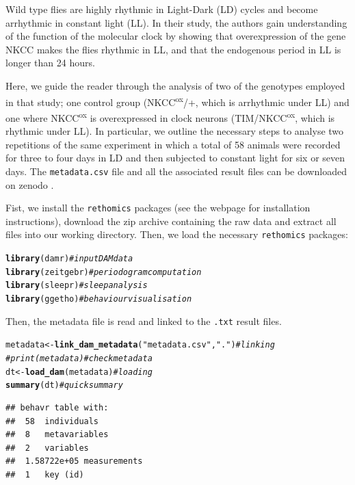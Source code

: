 \documentclass[10pt,letterpaper]{article}\usepackage[]{graphicx}\usepackage[]{color}
\makeatletter
\newcommand{\hlstr}[1]{\textcolor[rgb]{0.192,0.494,0.8}{#1}}%
\newcommand{\hlcom}[1]{\textcolor[rgb]{0.678,0.584,0.686}{\textit{#1}}}%
\newcommand{\hlstd}[1]{\textcolor[rgb]{0.345,0.345,0.345}{#1}}%
\newcommand{\hlkwb}[1]{\textcolor[rgb]{0.69,0.353,0.396}{#1}}%
\newcommand{\hlkwd}[1]{\textcolor[rgb]{0.737,0.353,0.396}{\textbf{#1}}}%
\newenvironment{kframe}{%
 \def\at@end@of@kframe{}%
 \ifinner\ifhmode%
  \def\at@end@of@kframe{\end{minipage}}%
  \begin{minipage}{\columnwidth}%
 \fi\fi%
 \def\FrameCommand##1{\hskip\@totalleftmargin \hskip-\fboxsep
 \colorbox{shadecolor}{##1}\hskip-\fboxsep
     \hskip-\linewidth \hskip-\@totalleftmargin \hskip\columnwidth}%
 \MakeFramed {\advance\hsize-\width
   \@totalleftmargin\z@ \linewidth\hsize
   \@setminipage}}%
 {\par\unskip\endMakeFramed%
 \at@end@of@kframe}
\newenvironment{knitrout}{}{} %
\makeatother
\begin{document}
Wild type flies are highly rhythmic in Light-Dark (LD) cycles and become arrhythmic in constant light (LL).
In their study, the authors gain understanding of the function of the molecular clock by showing that overexpression of the gene NKCC makes the flies rhythmic in LL,
and that the endogenous period in LL is longer than 24 hours.

Here, we guide the reader through the analysis of two of the genotypes employed in that study;
one control group (NKCC\textsuperscript{ox}/+, which is arrhythmic under LL) and one where NKCC\textsuperscript{ox} is overexpressed in clock neurons (TIM/NKCC\textsuperscript{ox}, which is rhythmic under LL).
In particular, we outline the necessary steps to analyse two repetitions of the same experiment in which a total of 58 animals were recorded for three to four days in LD and then subjected to constant light for six or seven days.
The \texttt{metadata.csv} file and all the associated result files can be downloaded on zenodo \cite{ogueta_maite_2018_1172980}.

Fist, we install the \texttt{rethomics} packages (see the webpage for installation instructions), download the zip archive containing the raw data and extract all files into our working directory.
Then, we load the necessary \texttt{rethomics} packages:

\begin{knitrout}
\color{fgcolor}\begin{kframe}
\begin{alltt}
\hlkwd{library}\hlstd{(damr)}      \hlcom{# input DAM data}
\hlkwd{library}\hlstd{(zeitgebr)}  \hlcom{# periodogram computation}
\hlkwd{library}\hlstd{(sleepr)}    \hlcom{# sleep analysis}
\hlkwd{library}\hlstd{(ggetho)}    \hlcom{# behaviour visualisation}
\end{alltt}
\end{kframe}
\end{knitrout}

Then, the metadata file is read and linked to the \texttt{.txt} result files.

\begin{knitrout}
\color{fgcolor}\begin{kframe}
\begin{alltt}
\hlstd{metadata} \hlkwb{<-} \hlkwd{link_dam_metadata}\hlstd{(}\hlstr{"metadata.csv"}\hlstd{,} \hlstr{"."}\hlstd{)}   \hlcom{# linking}
\hlcom{# print(metadata)                                    # check metadata}
\hlstd{dt} \hlkwb{<-} \hlkwd{load_dam}\hlstd{(metadata)}                             \hlcom{# loading}
\hlkwd{summary}\hlstd{(dt)}                                          \hlcom{# quick summary}
\end{alltt}
\begin{verbatim}
## behavr table with:
##  58	individuals
##  8	metavariables
##  2	variables
##  1.58722e+05	measurements
##  1	key (id)
\end{verbatim}
\end{kframe}
\end{knitrout}
\end{document}
